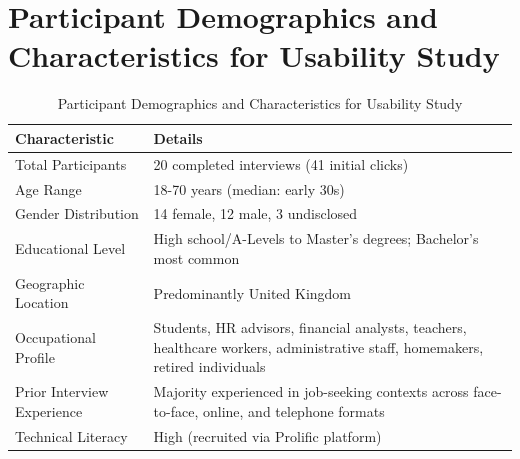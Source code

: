 \documentclass[sigchi,nonacm,manuscript]{acmart}
\begin{document}
\section{Participant Demographics and Characteristics for Usability Study}
\label{sec:usability_demographics}
\begin{table}[h]
    \caption{Participant Demographics and Characteristics for Usability Study}
    \label{tab:usability_demographics}
    \small
    \begin{tabular}{@{}p{4cm}|p{8cm}@{}}
    \toprule
    \textbf{Characteristic} & \textbf{Details} \\
    \midrule
    Total Participants & 20 completed interviews (41 initial clicks) \\
    Age Range & 18-70 years (median: early 30s) \\
    Gender Distribution & 14 female, 12 male, 3 undisclosed \\
    Educational Level & High school/A-Levels to Master's degrees; Bachelor's most common \\
    Geographic Location & Predominantly United Kingdom \\
    Occupational Profile & Students, HR advisors, financial analysts, teachers, healthcare workers, administrative staff, homemakers, retired individuals \\
    Prior Interview Experience & Majority experienced in job-seeking contexts across face-to-face, online, and telephone formats \\
    Technical Literacy & High (recruited via Prolific platform) \\
    \bottomrule
    \end{tabular}
\end{table}
\newpage
\end{document}
